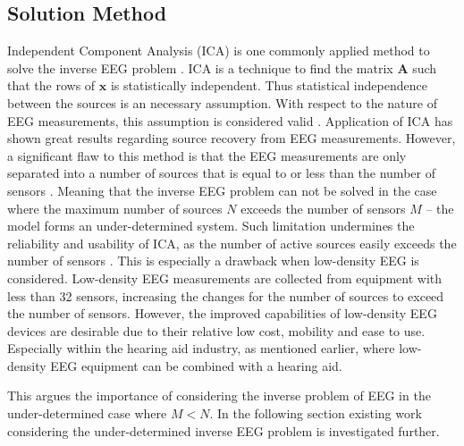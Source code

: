 \subsection{Solution Method}\label{sec:ICAsolution}
Independent Component Analysis (ICA) is one commonly applied method to solve the inverse EEG problem \cite{Scott1996}\cite{Scott1997}. ICA is a technique to find the matrix $\mathbf{A}$ such that the rows of $\mathbf{x}$ is statistically independent. Thus statistical independence between the sources is an necessary assumption. With respect to the nature of EEG measurements, this assumption is considered valid \cite[p. 3]{Scott1997}. 
Application of ICA has shown great results regarding source recovery from EEG measurements. 
However, a significant flaw to this method is that the EEG measurements are only separated into a number of sources that is equal to or less than the number of sensors \cite{Balkan2015}.
Meaning that the inverse EEG problem can not be solved in the case where the maximum number of sources $N$ exceeds the number of sensors $M$ -- the model forms an under-determined system. 
Such limitation undermines the reliability and usability of ICA, as the number of active sources easily exceeds the number of sensors \cite{phd2015}. 
This is especially a drawback when low-density EEG is considered. Low-density EEG measurements are collected from equipment with less than 32 sensors, increasing the changes for the number of sources to exceed the number of sensors. 
However, the improved capabilities of low-density EEG devices are desirable due to their relative low cost, mobility and ease to use. 
Especially within the hearing aid industry, as mentioned earlier, where low-density EEG equipment can be combined with a hearing aid.  

This argues the importance of considering the inverse problem of EEG in the under-determined case where $M<N$. In the following section existing work considering the under-determined inverse EEG problem is investigated further. 

